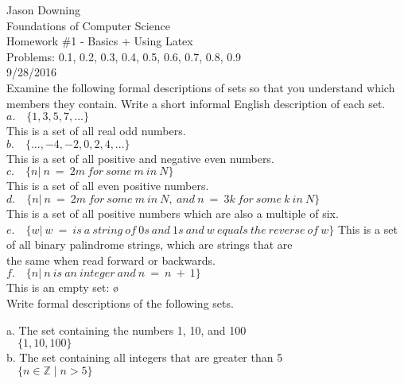 \documentclass[12pt]{article}
\begin{document}
	
\noindent
Jason Downing \\
Foundations of Computer Science \\
Homework \#1 - Basics + Using Latex \\
Problems: 0.1, 0.2, 0.3, 0.4, 0.5, 0.6, 0.7, 0.8, 0.9 \\
9/28/2016 \\

 \quad Examine the following formal descriptions of sets so that you understand which
members they contain. Write a short informal English description of each set. 
\\
\indent
$a. \quad \{1, 3, 5, 7, ...\} $ \\
\indent
This is a set of all real odd numbers. \\

$b. \quad \{...,-4,-2,0,2,4,...\} $ \\
\indent
This is a set of all positive and negative even numbers. \\

$c. \quad \{n |\ n \ = \ 2m \ for \ some \ m \ in \ N\} $ \\
\indent
This is a set of all even positive numbers. \\

$d. \quad \{n |\ n \ = \ 2m \ for \ some \ m \ in \ N, \ 
and \ n \ = \ 3k \ for \ some \ k \ in \ N\} $ \\
\indent
This is a set of all positive numbers which are also a multiple of six. \\

$e. \quad \{w |\ w \ = \ is \ a \ string \ of \ 0s \ 
and \ 1s \ and \ w \ equals \ the \ reverse \ of \ w \} $
\indent
This is a set of all binary palindrome strings, which are strings that are \\
\indent
the same when read forward or backwards. \\

$f. \quad \{n |\ n \ is \ an \ integer \ and \ n \ = \ n \ + \ 1 \} $ \\
\indent
This is an empty set: \o \\

 \quad Write formal descriptions of the following sets.

a. The set containing the numbers 1, 10, and 100 \\
\indent
$ \quad \{1, 10, 100\} $ \\

b. The set containing all integers that are greater than 5 \\
\indent
$ \quad \{n \in \mathbb{Z} \mid n > 5\} $ \\
\end{document}
